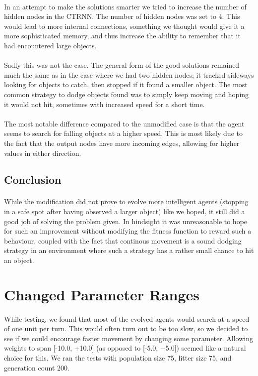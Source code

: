 \documentclass[a4paper,12pt]{article}
\begin{document}
\paragraph{}In an attempt to make the solutions smarter we tried to increase the number of hidden nodes in the CTRNN. The number of hidden nodes was set to 4. This would lead to more internal connections, something we thought would give it a more sophisticated memory, and thus increase the ability to remember that it had encountered large objects.
\paragraph{}Sadly this was not the case. The general form of the good solutions remained much the same as in the case where we had two hidden nodes; it tracked sideways looking for objects to catch, then stopped if it found a smaller object. The most common strategy to dodge objects found was to simply keep moving and hoping it would not hit, sometimes with increased speed for a short time.
\paragraph{}The most notable difference compared to the unmodified case is that the agent seems to search for falling objects at a higher speed. This is most likely due to the fact that the output nodes have more incoming edges, allowing for higher values in either direction.
\subsection{Conclusion}
\paragraph{}While the modification did not prove to evolve more intelligent agents (stopping in a safe spot after having observed a larger object) like we hoped, it still did a good job of solving the problem given. In hindsight it was unreasonable to hope for such an improvement without modifying the fitness function to reward such a behaviour, coupled with the fact that continous movement is a sound dodging strategy in an environment where such a strategy has a rather small chance to hit an object.

\section{Changed Parameter Ranges}
\paragraph{}While testing, we found that most of the evolved agents would search at a speed of one unit per turn. This would often turn out to be too slow, so we decided to see if we could encourage faster movement by changing some parameter. Allowing weights to span [-10.0, +10.0] (as opposed to [-5.0, +5.0]) seemed like a natural choice for this. We ran the tests with population size 75, litter size 75, and generation count 200.
\end{document}
